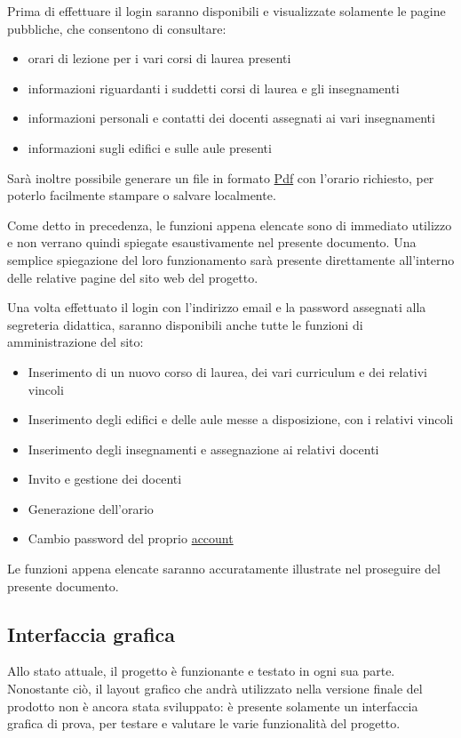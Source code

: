 \documentclass[11pt,a4paper]{article}
\begin{document}
Prima di effettuare il login saranno disponibili e visualizzate solamente le pagine pubbliche, che consentono di consultare:
\begin{itemize}
 \item orari di lezione per i vari corsi di laurea presenti
 \item informazioni riguardanti i suddetti corsi di laurea e gli insegnamenti
 \item informazioni personali e contatti dei docenti assegnati ai vari insegnamenti
 \item informazioni sugli edifici e sulle aule presenti
\end{itemize}
Sarà inoltre possibile generare un file in formato \underline{Pdf} con l'orario richiesto, per poterlo facilmente stampare o salvare localmente.

Come detto in precedenza, le funzioni appena elencate sono di immediato utilizzo e non verrano quindi spiegate esaustivamente nel presente documento.
Una semplice spiegazione del loro funzionamento sarà presente direttamente all'interno delle relative pagine del sito web del progetto.

\bigskip
Una volta effettuato il login con l'indirizzo email e la password assegnati alla segreteria didattica, saranno disponibili anche tutte le funzioni di amministrazione del sito:
\begin{itemize}
 \item Inserimento di un nuovo corso di laurea, dei vari curriculum e dei relativi vincoli
 \item Inserimento degli edifici e delle aule messe a disposizione, con i relativi vincoli
 \item Inserimento degli insegnamenti e assegnazione ai relativi docenti
 \item Invito e gestione dei docenti
 \item Generazione dell'orario
 \item Cambio password del proprio \underline{account}
\end{itemize}
Le funzioni appena elencate saranno accuratamente illustrate nel proseguire del presente documento.
\subsection{Interfaccia grafica}
Allo stato attuale, il progetto è funzionante e testato in ogni sua parte.
Nonostante ciò, il layout grafico che andrà utilizzato nella versione finale del prodotto non è ancora stata sviluppato: è presente solamente un interfaccia grafica di prova, per testare e valutare le varie funzionalità del progetto.
\end{document}
